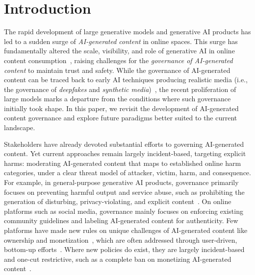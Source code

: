 \section{Introduction}
\label{sec:intro}

The rapid development of large generative models and generative AI products has led to a sudden surge of \textit{AI-generated content} in online spaces. This surge has fundamentally altered the scale, visibility, and role of generative AI in online content consumption~\cite{liang2025widespread,matatov2024examining,wei2024understanding,sun2025we,hua2024generative,guo2025exploring}, raising challenges for the \textit{governance of AI-generated content} to maintain trust and safety. While the governance of AI-generated content can be traced back to early AI techniques producing realistic media (i.e., the governance of \textit{deepfakes} and \textit{synthetic media})~\cite{westerlund2019emergence}, the recent proliferation of large models marks a departure from the conditions where such governance initially took shape. In this paper, we revisit the development of AI-generated content governance and explore future paradigms better suited to the current landscape.

Stakeholders have already devoted substantial efforts to governing AI-generated content. Yet current approaches remain largely incident-based, targeting explicit harms: moderating AI-generated content that maps to established online harm categories, under a clear threat model of attacker, victim, harm, and consequence. For example, in general-purpose generative AI products, governance primarily focuses on preventing harmful output and service abuse, such as prohibiting the generation of disturbing, privacy-violating, and explicit content~\cite{gao2025cannot,riccio2024exploring,klyman2024acceptable}. On online platforms such as social media, governance mainly focuses on enforcing existing community guidelines and labeling AI-generated content for authenticity. Few platforms have made new rules on unique challenges of AI-generated content like ownership and monetization~\cite{gao2026governance}, which are often addressed through user-driven, bottom-up efforts~\cite{lloyd2025there,lloyd2025ai}. Where new policies do exist, they are largely incident-based and one-cut restrictive, such as a complete ban on monetizing AI-generated content~\cite{gao2026governance}.


